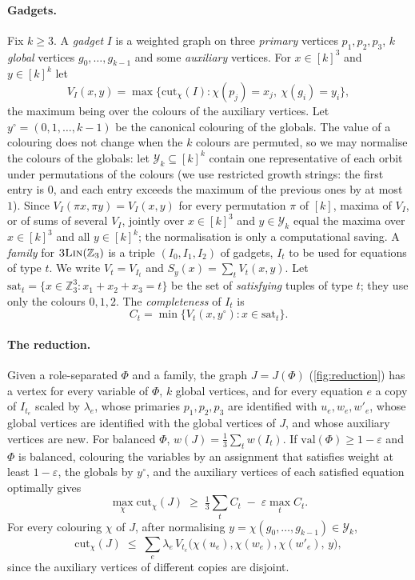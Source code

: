 \documentclass[11pt,letterpaper]{article}
\theoremstyle{remark}
\newcommand{\lin}{\textup{\textsc{3Lin}}(\mathbb{Z}_3)}
\newcommand{\Z}{\mathbb{Z}}
\newcommand{\eps}{\varepsilon}
\newcommand{\Y}{\mathcal{Y}}
\newcommand{\sat}{\mathrm{sat}}
\newcommand{\cut}{\mathrm{cut}}
\newcommand{\val}{\mathrm{val}}
\newcommand{\yc}{y^{\circ}}
\begin{document}
\paragraph{Gadgets.}
Fix $k\ge 3$. A \emph{gadget} $I$ is a weighted graph on three \emph{primary} vertices $p_1,p_2,p_3$,
$k$ \emph{global} vertices $g_0,\dots,g_{k-1}$ and some \emph{auxiliary} vertices. For $x\in[k]^3$ and
$y\in[k]^k$ let
\[
  V_I(x,y) = \max\{\cut_\chi(I) : \chi(p_j)=x_j,\ \chi(g_i)=y_i\},
\]
the maximum being over the colours of the auxiliary vertices. Let $\yc=(0,1,\dots,k-1)$ be the canonical
colouring of the globals. The value of a colouring does not change when the $k$ colours are permuted, so
we may normalise the colours of the globals: let $\Y_k\subseteq[k]^k$ contain one representative of each
orbit under permutations of the colours (we use restricted growth strings: the first entry is $0$, and
each entry exceeds the maximum of the previous ones by at most $1$). Since $V_I(\pi x,\pi y)=V_I(x,y)$ for every
permutation $\pi$ of $[k]$, maxima of $V_I$, or of sums of several $V_I$, jointly over $x\in[k]^3$ and
$y\in\Y_k$ equal the maxima over $x\in[k]^3$ and all $y\in[k]^k$; the normalisation is only a
computational saving. A \emph{family} for $\lin$ is a triple $(I_0,I_1,I_2)$ of gadgets, $I_t$ to be used for equations of
type $t$. We write $V_t=V_{I_t}$ and $S_y(x)=\sum_tV_t(x,y)$. Let
$\sat_t=\{x\in\Z_3^3: x_1+x_2+x_3=t\}$ be the set of \emph{satisfying} tuples of type $t$; they use only the
colours $0,1,2$. The \emph{completeness} of $I_t$ is
\[
  C_t = \min\{V_t(x,\yc) : x\in\sat_t\}.
\]

\paragraph{The reduction.}
Given a role-separated $\Phi$ and a family, the graph $J=J(\Phi)$ (\cref{fig:reduction}) has a vertex for every variable of
$\Phi$, $k$ global vertices, and for every equation $e$ a copy of $I_{t_e}$ scaled by $\lambda_e$, whose
primaries $p_1,p_2,p_3$ are identified with $u_e,w_e,w'_e$, whose global vertices are identified with the
global vertices of $J$, and whose auxiliary vertices are new. For balanced $\Phi$,
$w(J)=\frac13\sum_t w(I_t)$. If $\val(\Phi)\ge 1-\eps$ and $\Phi$ is balanced, colouring the variables by
an assignment that satisfies weight at least $1-\eps$, the globals by $\yc$, and the auxiliary vertices of
each satisfied equation optimally gives
\begin{equation}\label{eq:completeness}
  \max_\chi \cut_\chi(J) \;\ge\; \tfrac13\textstyle\sum_t C_t \;-\; \eps\max_t C_t .
\end{equation}
For every colouring $\chi$ of $J$, after normalising $y=\chi(g_0,\dots,g_{k-1})\in\Y_k$,
\begin{equation}\label{eq:soundness-basic}
  \cut_\chi(J) \;\le\; \sum_e \lambda_e\, V_{t_e}\big(\chi(u_e),\chi(w_e),\chi(w'_e),\,y\big),
\end{equation}
since the auxiliary vertices of different copies are disjoint.
\end{document}
